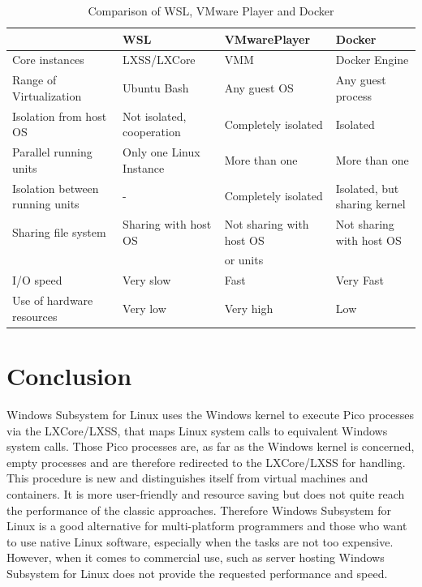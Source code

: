 \documentclass[utf8,biblatex, ngerman, english]{lni}
\begin{document}
\clearpage
\begin{table}[!htbp]
\centering
\begin{tabular}{|l||l||l|l|} 
\hline
& WSL & VMwarePlayer & Docker \\ \hline 
Core instances & LXSS/LXCore &  VMM & Docker Engine \\ \hline 
Range of Virtualization & Ubuntu Bash & Any guest OS & Any guest process \\ \hline
Isolation from host OS & Not isolated, cooperation & Completely isolated & Isolated \\ \hline
Parallel running units & Only one Linux Instance & More than one  & More than one \\ \hline
Isolation between running units & -  &  Completely isolated & Isolated, but sharing kernel\\ \hline 
Sharing file system &  Sharing with host OS & Not sharing with host OS & Not sharing with host OS \\ 
& & or units & \\ \hline
I/O speed & Very slow & Fast & Very Fast \\ \hline
Use of hardware resources & Very low & Very high & Low \\ \hline

\end{tabular}
\caption{Comparison of WSL, VMware Player and Docker}
\label{tab:demo}
\end{table}


\section{Conclusion}
Windows Subsystem for Linux uses the Windows kernel to execute Pico processes via the LXCore/LXSS, that maps Linux system calls to equivalent Windows system calls. Those Pico processes are, as far as the Windows kernel is concerned, empty processes and are therefore redirected to the LXCore/LXSS for handling. This procedure is new and distinguishes itself from virtual machines and containers. It is more user-friendly and resource saving but does not quite reach the performance of the classic approaches. Therefore Windows Subsystem for Linux is a good alternative for multi-platform programmers and those who want to use native Linux software, especially when the tasks are not too expensive. However, when it comes to commercial use, such as server hosting Windows Subsystem for Linux does not provide the requested performance and speed.

\newpage
{}
\printbibliography
\end{document}
